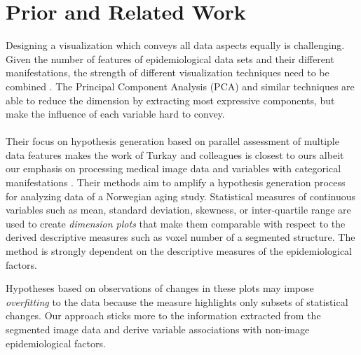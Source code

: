 \documentclass[journal]{style/vgtc} 			          %
\begin{document}
\section{Prior and Related Work}
Designing a visualization which conveys all data aspects equally is challenging.
%
Given the number of features of epidemiological data sets and their different manifestations, the strength of different visualization techniques need to be combined \cite{Buja91, Konyha2009}.
%
The Principal Component Analysis (PCA) and similar techniques are able to reduce the dimension by extracting most expressive components, but make the influence of each variable hard to convey.
\\\\
Their focus on hypothesis generation based on parallel assessment of multiple data features makes the work of Turkay and colleagues is closest to ours albeit our emphasis on processing medical image data and variables with categorical manifestations \cite{Turkay2013}.
%
Their methods aim to amplify a hypothesis generation process for analyzing data of a Norwegian aging study.
%
Statistical measures of continuous variables such as mean, standard deviation, skewness, or inter-quartile range are used to create \emph{dimension plots} that make them comparable with respect to the derived descriptive measures such as voxel number of a segmented structure.
%
%
%
%
%
The method is strongly dependent on the descriptive measures of the epidemiological factors.

Hypotheses based on observations of changes in these plots may impose \emph{overfitting} to the data because the measure highlights only subsets of statistical changes.
%
Our approach sticks more to the information extracted from the segmented image data and derive variable associations with non-image epidemiological factors.
\end{document}
